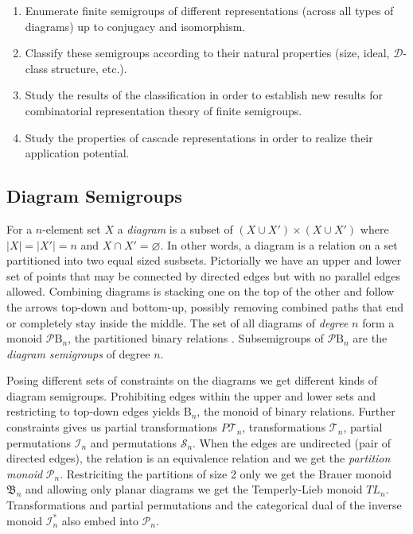 \documentclass{amsart}
\newcommand{\BinRel}{\text{B}}
\newcommand{\InvMon}{\mathcal I}
\newcommand{\DualInvMon}{{\mathcal I}^*}
\newcommand{\FullTrans}{\mathcal T}
\newcommand{\Symmetric}{\mathcal S}
\newcommand{\Brauer}{\mathfrak B}
\newcommand{\Partition}{\mathcal P}
\newcommand{\cD}{\mathcal D}
\newcommand{\todo}[1]{ \textsf{\color{red}{[TODO:  #1 ]}}}
\begin{document}
\begin{enumerate}
\item Enumerate finite semigroups of different representations (across all types of diagrams) up to conjugacy and isomorphism.
\item Classify these semigroups according to their natural properties (size, ideal, $\cD$-class structure, etc.).
\item Study the results of the classification in order to establish new results for combinatorial representation theory of finite semigroups.
\item Study the properties of cascade representations in order to realize their application potential.
\end{enumerate}


\subsection{Diagram Semigroups}

For a $n$-element set $X$ a \emph{diagram} is a subset of $(X\cup X')\times (X\cup X')$ where $|X|=|X'|=n$ and $X\cap X'=\varnothing$.
In other words, a diagram is a relation on a set partitioned into two equal sized susbsets.
Pictorially we have an upper and lower set of points that may be connected by directed edges but with no parallel edges allowed.
Combining diagrams is stacking one on the top of the other and follow the arrows top-down and bottom-up, possibly removing combined paths that end or completely stay inside the middle. \todo{This isn't very precise, is it?}
The set of all diagrams of \emph{degree} $n$ form a monoid $\Partition\BinRel_n$, the partitioned binary relations \cite{PartBinRel2013}. Subsemigroups of $\Partition\BinRel_n$ are the \emph{diagram semigroups} of degree $n$.

Posing different sets of constraints on the diagrams we get different kinds of diagram semigroups.
Prohibiting edges within the upper and lower sets and restricting to top-down edges yields $\BinRel_n$, the monoid of binary relations. Further constraints gives us partial transformations $P\FullTrans_n$, transformations $\FullTrans_n$, partial permutations $\InvMon_n$ and permutations $\Symmetric_n$.
When the edges are undirected (pair of directed edges), the relation is an equivalence relation and we get the \emph{partition monoid} $\Partition_n$.
Restriciting the partitions of size 2 only we get the Brauer monoid $\Brauer_n$ and allowing only planar diagrams we get the Temperly-Lieb monoid $TL_n$.
Transformations and partial permutations and the categorical dual of the inverse monoid $\DualInvMon_n$ also embed into $\Partition_n$.
\todo{Ask JE for quick explanation why $P\FullTrans_n$ does not embed into $\Partition_n$.}
\end{document}
